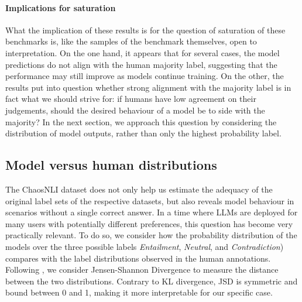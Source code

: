 \paragraph{Implications for saturation}
What the implication of these results is for the question of saturation of these benchmarks is, like the samples of the benchmark themselves, open to interpretation.
On the one hand, it appears that for several cases, the model predictions do not align with the human majority label, suggesting that the performance may still improve as models continue training.
On the other, the results put into question whether strong alignment with the majority label is in fact what we should strive for: if humans have low agreement on their judgements, should the desired behaviour of a model be to side with the majority?
In the next section, we approach this question by considering the distribution of model outputs, rather than only the highest probability label.

% 
% 

\subsection{Model versus human distributions}\label{subsec:chaosnli_dist}
The ChaosNLI dataset does not only help us estimate the adequacy of the original label sets of the respective datasets, but also reveals model behaviour in scenarios without a single correct answer.
In a time where LLMs are deployed for many users with potentially different preferences, this question has become very practically relevant.
To do so, we consider how the probability distribution of the models over the three possible labels \textit{Entailment}, \textit{Neutral}, and \textit{Contradiction}) compares with the label distributions observed in the human annotations.
Following \citet{nie-etal-2020-learn}, we consider Jensen-Shannon Divergence \citep[JSD][]{menendez1997jensen} to measure the distance between the two distributions. 
%
%
Contrary to KL divergence, JSD is symmetric and bound between 0 and 1, making it more interpretable for our specific case.

